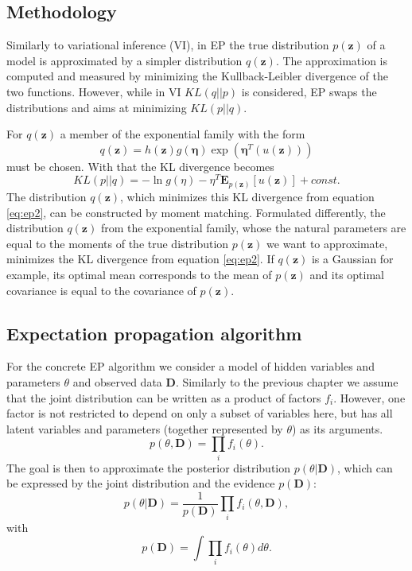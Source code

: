 \documentclass{sigkdd}
\begin{document}
\subsection{Methodology}
Similarly to variational inference (VI), in EP the true distribution $p(\mathbf{z})$ of a model is approximated by a simpler distribution $q(\mathbf{z})$. The approximation is computed and measured by minimizing the Kullback-Leibler divergence of the two functions. However, while in VI $KL(q||p)$ is considered, EP swaps the distributions and aims at minimizing $KL(p||q)$.

For $q(\mathbf{z})$ a member of the exponential family with the form
\begin{equation}\label{eq:ep1}
q(\mathbf{z}) = h(\mathbf{z})g(\mathbf{\eta}) \exp(\mathbf{\eta}^T(u(\mathbf{z})))
\end{equation}
must be chosen. With that the KL divergence becomes
\begin{equation}\label{eq:ep2}
KL(p||q)= - \ln g(\eta) - \eta^T \mathbf{E}_{p(\mathbf{z})} [u(\mathbf{z})] + const.
\end{equation}
The distribution $q(\mathbf{z})$, which minimizes this KL divergence from equation \ref{eq:ep2}, can be constructed by moment matching. Formulated differently, the distribution $q(\mathbf{z})$ from the exponential family, whose the natural parameters are equal to the moments of the true distribution $p(\mathbf{z})$ we want to approximate, minimizes the KL divergence from equation \ref{eq:ep2}. If $q(\mathbf{z})$ is a Gaussian for example, its optimal mean corresponds to the mean of $p(\mathbf{z})$ and its optimal covariance is equal to the covariance of $p(\mathbf{z})$.

\subsection{Expectation propagation algorithm}
For the concrete EP algorithm we consider a model of hidden variables and parameters $\theta$ and observed data $\mathbf{D}$. Similarly to the previous chapter we assume that the joint distribution can be written as a product of factors $f_i$. However, one factor is not restricted to depend on only a subset of variables here, but has all latent variables and parameters (together represented by $\theta$) as its arguments.
\begin{equation}\label{eq:ep3}
p(\theta, \mathbf{D}) = \prod_i f_i(\theta).
\end{equation}
The goal is then to approximate the posterior distribution $p(\theta|\mathbf{D})$, which can be expressed by the joint distribution and the evidence $p(\mathbf{D})$:
\begin{equation}\label{eq:ep4}
p(\theta|\mathbf{D}) = \frac{1}{p(\mathbf{D})} \prod_i f_i(\theta , \mathbf{D}),
\end{equation}
with 
\begin{equation}\label{eq:ep5}
p(\mathbf{D}) = \int \prod_i f_i(\theta) d\theta.
\end{equation}  
\end{document}
